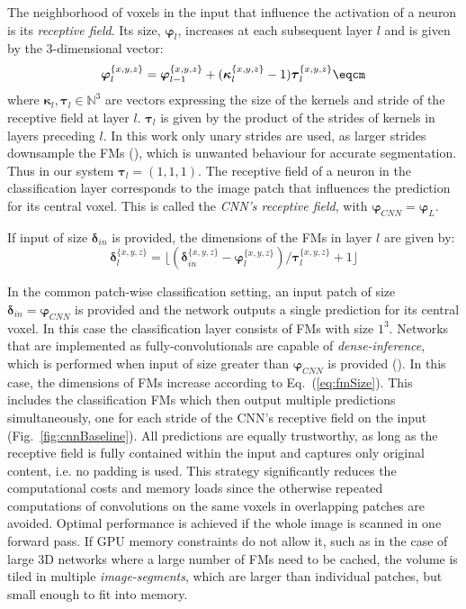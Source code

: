 The neighborhood of voxels in the input that influence the activation of a neuron is its \textit{receptive field}. Its size, $\boldsymbol{\varphi}_l$, increases at each subsequent layer $l$ and is given by the 3-dimensional vector: 
\begin{equation} \label{eq:receptiveFile}
\boldsymbol{\varphi}_l^{\{ x,y,z\}} = \boldsymbol{\varphi}_{l-1}^{\{ x,y,z\}} + (\boldsymbol{\kappa}_l^{\{ x,y,z\}}-1) \boldsymbol{\tau}_l^{\{ x,y,z\}} \eqcm
\end{equation}
where $\boldsymbol{\kappa}_l,\boldsymbol{\tau}_l \in \mathbb{N}^3$ are vectors expressing the size of the kernels and stride of the receptive field at layer $l$. $\boldsymbol{\tau}_l$ is given by the product of the strides of kernels in layers preceding $l$. In this work only unary strides are used, as larger strides downsample the FMs (\cite{Springenberg2015}), which is unwanted behaviour for accurate segmentation. Thus in our system $\boldsymbol{\tau}_l = (1,1,1)$. The receptive field of a neuron in the classification layer corresponds to the image patch that influences the prediction for its central voxel. This is called the \textit{CNN's receptive field}, with $\boldsymbol{\varphi}_{CNN}=\boldsymbol{\varphi}_{L}$.

If input of size $\boldsymbol{\delta}_{in}$ is provided, the dimensions of the FMs in layer $l$ are given by:
\begin{equation} \label{eq:fmSize}
\boldsymbol{\delta}_l^{\{ x,y,z\}} = \lfloor (\boldsymbol{\delta}_{in}^{\{ x,y,z\}} - \boldsymbol{\varphi}_l^{\{ x,y,z\}}) / \boldsymbol{\tau}_l^{\{ x,y,z\}}	 +1 \rfloor
\end{equation}

In the common patch-wise classification setting, an input patch of size $\boldsymbol{\delta}_{in} = \boldsymbol{\varphi}_{CNN}$ is provided and the network outputs a single prediction for its central voxel. In this case the classification layer consists of FMs with size $1^3$. Networks that are implemented as fully-convolutionals are capable of \textit{dense-inference}, which is performed when input of size greater than $\boldsymbol{\varphi}_{CNN}$ is provided (\cite{Sermanet2013}). In this case, the dimensions of FMs increase according to Eq.~(\ref{eq:fmSize}). This includes the classification FMs which then output multiple predictions simultaneously, one for each stride of the CNN's receptive field on the input (Fig.~\ref{fig:cnnBaseline}). All predictions are equally trustworthy, as long as the receptive field is fully contained within the input and captures only original content, i.e. no padding is used. This strategy significantly reduces the computational costs and memory loads since the otherwise repeated computations of convolutions on the same voxels in overlapping patches are avoided. Optimal performance is achieved if the whole image is scanned in one forward pass. If GPU memory constraints do not allow it, such as in the case of large 3D networks where a large number of FMs need to be cached, the volume is tiled in multiple \textit{image-segments}, which are larger than individual patches, but small enough to fit into memory.

